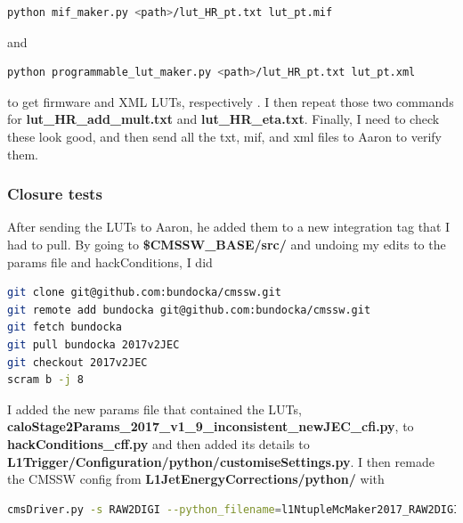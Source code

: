 \begin{lstlisting}[belowskip=-0.7cm, language=sh, numbers=none]
python mif_maker.py <path>/lut_HR_pt.txt lut_pt.mif
\end{lstlisting}

and

\begin{lstlisting}[belowskip=-0.7cm, language=sh, numbers=none]
python programmable_lut_maker.py <path>/lut_HR_pt.txt lut_pt.xml
\end{lstlisting}

to get firmware and XML LUTs, respectively . I then repeat those two commands for \textbf{lut\_HR\_add\_mult.txt} and \textbf{lut\_HR\_eta.txt}. Finally, I need to check these look good, and then send all the txt, mif, and xml files to Aaron to verify them.


\subsubsection{Closure tests}

After sending the LUTs to Aaron, he added them to a new integration tag that I had to pull. By going to \textbf{\$CMSSW\_BASE/src/} and undoing my edits to the params file and hackConditions, I did

\begin{lstlisting}[belowskip=-0.7cm, language=sh, numbers=none]
git clone git@github.com:bundocka/cmssw.git
git remote add bundocka git@github.com:bundocka/cmssw.git
git fetch bundocka
git pull bundocka 2017v2JEC
git checkout 2017v2JEC
scram b -j 8
\end{lstlisting}

I added the new params file that contained the LUTs, \textbf{caloStage2Params\_2017\_v1\_9\_inconsistent\_newJEC\_cfi.py}, to \textbf{hackConditions\_cff.py} and then added its details to \textbf{L1Trigger/Configuration/python/customiseSettings.py}. I then remade the CMSSW config from \textbf{L1JetEnergyCorrections/python/} with

\begin{lstlisting}[belowskip=-0.7cm, language=sh, numbers=none]
cmsDriver.py -s RAW2DIGI --python_filename=l1NtupleMcMaker2017_RAW2DIGI_v2_closureTest.py -n 100 --no_output --no_exec --era=Run2_2017 --mc --conditions=92X_upgrade2017_TSG_For90XSamples_V1 --customise=L1Trigger/Configuration/customiseReEmul.L1TReEmulMCFrom90xRAWSimHcalTP --customise=L1Trigger/L1TNtuples/customiseL1Ntuple.L1NtupleRAWEMUGEN_MC --customise=L1Trigger/Configuration/customiseSettings.L1TSettingsToCaloStage2Params_2017_v1_9_inconsistent_newJEC --filein=/store/mc/PhaseISpring17DR/QCD_Pt-15to3000_TuneCUETP8M1_Flat_13TeV_pythia8/GEN-SIM-RAW/FlatPU0to70NZS_90X_upgrade2017_realistic_v20-v1/120000/003FF53C-8232-E711-9340-7CD30ACE160C.root
\end{lstlisting}

